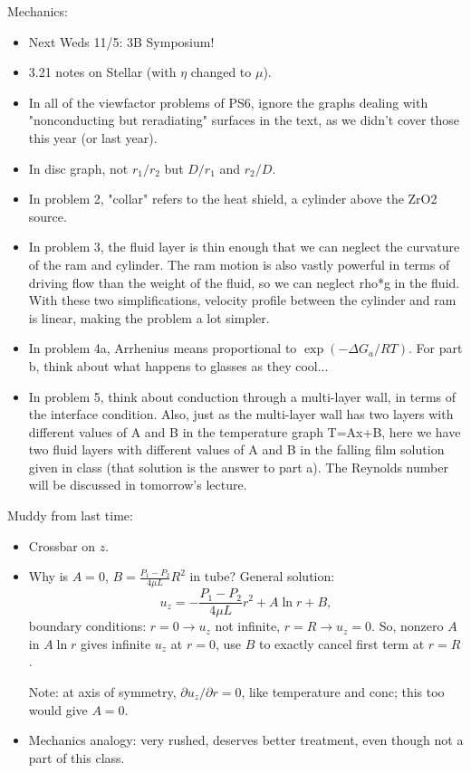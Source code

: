 \documentclass{report}
\begin{document}
Mechanics:
\begin{itemize}
\item Next Weds 11/5: 3B Symposium!
\item 3.21 notes on Stellar (with $\eta$ changed to $\mu$).
\item In all of the viewfactor problems of PS6, ignore the graphs dealing with
  "nonconducting but reradiating" surfaces in the text, as we didn't cover
  those this year (or last year).
\item In disc graph, not $r_1/r_2$ but $D/r_1$ and $r_2/D$.
\item In problem 2, "collar" refers to the heat shield, a cylinder above the
  ZrO2 source.
\item In problem 3, the fluid layer is thin enough that we can neglect the
  curvature of the ram and cylinder.  The ram motion is also vastly powerful in
  terms of driving flow than the weight of the fluid, so we can neglect rho*g
  in the fluid.  With these two simplifications, velocity profile between the
  cylinder and ram is linear, making the problem a lot simpler.
\item In problem 4a, Arrhenius means proportional to $\exp(-\Delta G_a/RT)$.
  For part b, think about what happens to glasses as they cool...
\item In problem 5, think about conduction through a multi-layer wall, in terms
  of the interface condition.  Also, just as the multi-layer wall has two
  layers with different values of A and B in the temperature graph T=Ax+B, here
  we have two fluid layers with different values of A and B in the falling film
  solution given in class (that solution is the answer to part a).  The
  Reynolds number will be discussed in tomorrow's lecture.
\end{itemize}

\noindent Muddy from last time:
\begin{itemize}
\item Crossbar on $z$.
\item Why is $A=0$, $B=\frac{P_1-P_2}{4\mu L}R^2$ in tube?  General solution:
  $$u_z = -\frac{P_1-P_2}{4\mu L}r^2 + A\ln r + B,$$
  boundary conditions: $r=0\rightarrow u_z$ not infinite, $r=R\rightarrow
  u_z=0$.  So, nonzero $A$ in $A\ln r$ gives infinite $u_z$ at $r=0$, use $B$
  to exactly cancel first term at $r=R$.

  Note: at axis of symmetry, $\partial u_z/\partial r=0$, like temperature and
  conc; this too would give $A=0$.
\item Mechanics analogy: very rushed, deserves better treatment, even though
  not a part of this class.
\end{itemize}
\end{document}
